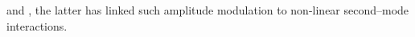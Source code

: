 \citet{SivasubramanianFasel2014} and \citet{UnnikrishnanGaitonde2021}, the latter has linked such amplitude modulation to non-linear second--mode interactions.






